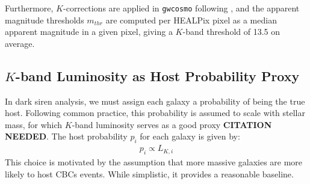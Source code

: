 Furthermore, $K$-corrections are applied in \texttt{gwcosmo} following \cite{kochanek2001k}, and the apparent magnitude thresholds $m_{thr}$ are computed per HEALPix pixel as a median apparent magnitude in a given pixel, giving a $K$-band threshold of 13.5 on average.

\subsection{$K$-band Luminosity as Host Probability Proxy}

In dark siren analysis, we must assign each galaxy a probability of being the true host. Following common practice, this probability is assumed to scale with stellar mass, for which $K$-band luminosity serves as a good proxy \textbf{CITATION NEEDED}. The host probability  $p_i$ for each galaxy is given by:
\begin{align}
    p_i \propto L_{K, i}
\end{align}
This choice is motivated by the assumption that more massive galaxies are more likely to host \acp{CBC} events. While simplistic, it provides a reasonable baseline.